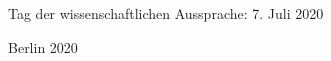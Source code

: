 \begin{titlepage}
\begin{center}
\begin{varwidth}{\textwidth}
      Tag der wissenschaftlichen Aussprache: 7. Juli 2020
    \end{varwidth}
  \end{center}
  \vspace{0.65cm}
  \begin{center}
    Berlin 2020

    \vfill

    {\textcolor{white}{\sffamily\docdate}}
  \end{center}
\end{titlepage}
